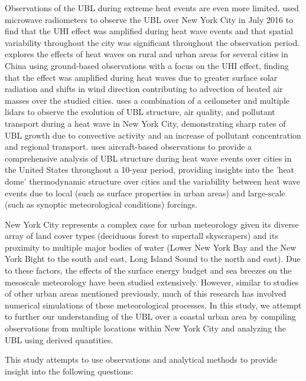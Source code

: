 Observations of the UBL during extreme heat events are even more limited. \citet{ramamurthy2017d} used microwave radiometers to observe the UBL over New York City in July 2016 to find that the UHI effect was amplified during heat wave events and that spatial variability throughout the city was significant throughout the observation period. \citet{jiang2019} explores the effects of heat waves on rural and urban areas for several cities in China using ground-based observations with a focus on the UHI effect, finding that the effect was amplified during heat waves due to greater surface solar radiation and shifts in wind direction contributing to advection of heated air masses over the studied cities. \citep{wu2019} uses a combination of a ceilometer and multiple lidars to observe the evolution of UBL structure, air quality, and pollutant transport during a heat wave in New York City, demonstrating sharp rates of UBL growth due to convective activity and an increase of pollutant concentration and regional transport. \citet{zhang2020} uses aircraft-based observations to provide a comprehensive analysis of UBL structure during heat wave events over cities in the United States throughout a 10-year period, providing insights into the 'heat dome' thermodynamic structure over cities and the variability between heat wave events due to local (such as surface properties in urban areas) and large-scale (such as synoptic meteorological conditions) forcings. 

New York City represents a complex case for urban meteorology given its diverse array of land cover types (deciduous forest to supertall skyscrapers) and its proximity to multiple major bodies of water (Lower New York Bay and the New York Bight to the south and east, Long Island Sound to the north and east). Due to these factors, the effects of the surface energy budget \citep{hrisko2021, ramamurthy2014, tewari2019} and sea breezes \citep{childs2005, colle2010, frizzola1963, gedzelman2003, han2022, melecio2018, thompson2007} on the mesoscale meteorology have been studied extensively. However, similar to studies of other urban areas mentioned previously, much of this research has involved numerical simulations of these meteorological processes. In this study, we attempt to further our understanding of the UBL over a coastal urban area by compiling observations from multiple locations within New York City and analyzing the UBL using derived quantities.

This study attempts to use observations and analytical methods to provide insight into the following questions:

